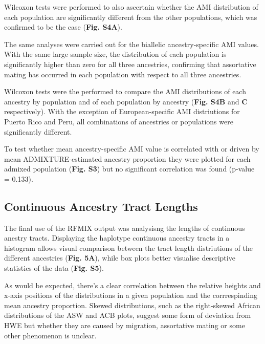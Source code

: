 \documentclass[11pt]{article}
\begin{document}
Wilcoxon tests were performed to also ascertain whether the AMI distribution of each population are significantly different from the other populations, which was confirmed to be the case (\textbf{Fig. S4A}). 

The same analyses were carried out for the biallelic ancestry-specific AMI values. With the same large sample size, the distribution of each population is significantly higher than zero for all three ancestries, confirming that assortative mating has occurred in each population with respect to all three ancestries.

Wilcoxon tests were the performed to compare the AMI distributions of each ancestry by population and of each population by ancestry (\textbf{Fig. S4B} and \textbf{C} respectively). With the exception of European-specific AMI distriutions for Puerto Rico and Peru, all combinations of ancestries or populations were significantly different. 

To test whether mean ancestry-specific AMI value is correlated with or driven by mean ADMIXTURE-estimated ancestry proportion they were plotted for each admixed population (\textbf{Fig. S3}) but no significant correlation was found (p-value = 0.133). 







\subsection{Continuous Ancestry Tract Lengths}


The final use of the RFMIX output was analysisng the lengths of continuous anestry tracts. Displaying the haplotype continuous ancestry tracts in a histogram allows visual comparison between the tract length distriutions of the different ancestries (\textbf{Fig. 5A}), while box plots better visualise descriptive statistics of the data (\textbf{Fig. S5}).

As would be expected, there's a clear correlation between the relative heights and x-axis positions of the distributions in a given population and the corrrespinding mean ancestry proportion. Skewed distributions, such as the right-skewed African distributions of the ASW and ACB plots, suggest some form of deviation from HWE but whether they are caused by migration, assortative mating or some other phenomenon is unclear.
\end{document}
